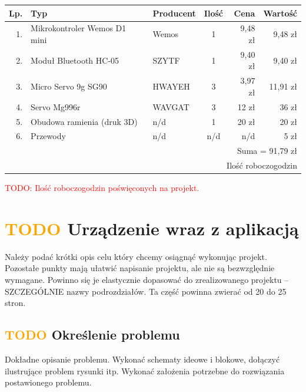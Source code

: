 \documentclass[11pt,titlepage]{article}
\begin{document}
\begin{center}
    \begin{tabular}{|r|l|l|c|r|r|}
        \hline
        Lp. & Typ                          & Producent & Ilość & Cena    & Wartość  \\
        \hline
        1.  & Mikrokontroler Wemos D1 mini & Wemos     & 1     & 9,48 zł & 9,48 zł  \\
        2.  & Moduł Bluetooth HC-05        & SZYTF     & 1     & 9,40 zł & 9,40 zł  \\
        3.  & Micro Servo 9g SG90          & HWAYEH    & 3     & 3,97 zł & 11,91 zł \\
        4.  & Servo Mg996r                 & WAVGAT    & 3     & 12 zł   & 36 zł    \\
        5.  & Obudowa ramienia (druk 3D)   & n/d       & 1     & 20 zł   & 20 zł    \\
        6.  & Przewody                     & n/d       & n/d   & n/d     & 5 zł     \\
        \hline
        \multicolumn{6}{|r|}{Suma = 91,79 zł}                                       \\
        \hline
        \multicolumn{6}{|r|}{Ilość roboczogodzin}                                   \\
        \hline
    \end{tabular}
\end{center}

\textcolor{red}{TODO: Ilość roboczogodzin poświęconych na projekt.}

\section{\textcolor{orange}{TODO} Urządzenie wraz z aplikacją}

Należy podać krótki opis celu który chcemy osiągnąć wykonując projekt.
Pozostałe punkty mają ułatwić napisanie projektu, ale nie są bezwzględnie wymagane. Powinno się je elastycznie dopasować do zrealizowanego projektu – SZCZEGÓLNIE nazwy podrozdziałów.
Ta część powinna zwierać od 20 do 25 stron.

\subsection{\textcolor{orange}{TODO} Określenie problemu}

Dokładne opisanie problemu. Wykonać schematy ideowe i blokowe, dołączyć ilustrujące problem rysunki itp. Wykonać założenia potrzebne do rozwiązania postawionego problemu.
\end{document}
